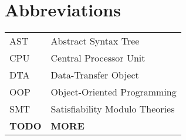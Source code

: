 \chapter*{Abbreviations}


\noindent
\begin{longtable}{@{}p{}p{}@{}}
AST & Abstract Syntax Tree \\
CPU & Central Processor Unit \\
DTA & Data-Transfer Object \\
OOP & Object-Oriented Programming \\
SMT & Satisfiability Modulo Theories \\
\textbf{TODO} & \textbf{MORE}
\end{longtable}

